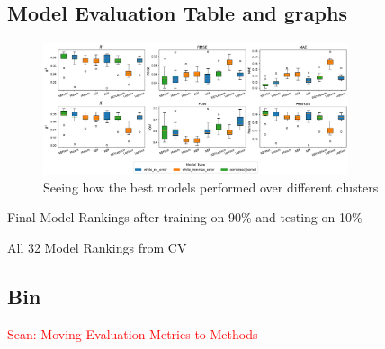 \documentclass{ucdgradtaughtthesis}
\newcommand{\Sean}[1]{{\textcolor{red}{{Sean: #1}} }}
\begin{document}
\subsection{Model Evaluation Table and graphs}
\label{appendix:D}

\begin{figure}[H]
    \centering
    \includegraphics[width=0.8\textwidth]{LatexPlots/CV_plots/boxplots.png}
    \caption{Seeing how the best models performed over different clusters}
    \label{fig:boxplots}
\end{figure}

\begin{table}[H]
    \centering
    \caption{Final Model Rankings after training on 90\% and testing on 10\%}
    {\fontsize{7}{9.5}\selectfont
    }
    \label{tab:finalmadelsrankingtable}
\end{table}



\begin{table}[H]
    \centering
    \caption{All 32 Model Rankings from CV}
    {\fontsize{7}{9.5}\selectfont
    }
    \label{tab:rankingtable}
\end{table}
    

\subsection{Bin}
\label{appendix:bin}
\Sean{Moving Evaluation Metrics to Methods}
\end{document}
